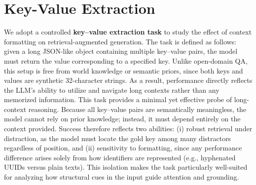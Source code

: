 \documentclass{article} %
\newcommand{\cnorm}{\textsc{C-Norm}}
\begin{document}





\appendix
\newpage
\section{Key-Value Extraction}\label{kvprompt}
We adopt a controlled \textbf{key–value extraction task} to study the effect of context formatting on retrieval-augmented generation. The task is defined as follows: given a long JSON-like object containing multiple key–value pairs, the model must return the value corresponding to a specified key. Unlike open-domain QA, this setup is free from world knowledge or semantic priors, since both keys and values are synthetic 32-character strings. As a result, performance directly reflects the 
LLM’s ability to utilize and navigate long contexts rather than any memorized information.
This task provides a minimal yet effective probe of long-context reasoning. Because all key–value pairs are semantically meaningless, the model cannot rely on prior knowledge; instead, it must depend entirely on the context provided. Success therefore reflects two abilities: (i) robust retrieval under distraction, as the model must locate the gold key among many distractors regardless of position, and (ii) sensitivity to formatting, since any performance difference arises solely from how identifiers are represented (e.g., hyphenated UUIDs versus plain texts). This isolation makes the task particularly well-suited for analyzing how structural cues in the input guide attention and grounding.
\end{document}

